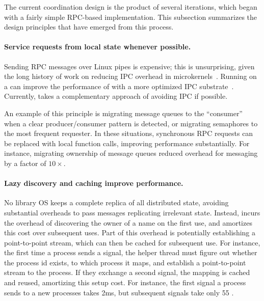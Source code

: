 \label{sec:libos:namespaces:lessons}

The current coordination design is the product of several iterations, which began 
with a fairly simple RPC-based implementation. %
This subsection summarizes the design principles that have emerged from this process.

\paragraph{Service requests from local state whenever possible.}
Sending RPC messages over Linux pipes is expensive;
this is unsurprising, given the long history of 
work on reducing IPC overhead in microkernels~\cite{liedtke93sosp,chen93memory}.  
Running on a \microkernel{} can improve the performance of \graphene{} with
a more optimized IPC substrate~\cite{liedtke95sosp,klein09sel4,elphinstone13microkernels}. Currently, \graphene{} takes a complementary approach of avoiding IPC if possible.

An example of this principle is migrating message queues to the ``consumer'' when a 
clear producer/consumer pattern is detected, or migrating semaphores to the most frequent requester.
In these situations, synchronous RPC requests can be replaced with local function calls, improving
performance substantially.  For instance, migrating ownership of message queues 
reduced overhead for messaging by a factor of $10\times$.

\paragraph{Lazy discovery and caching improve performance.}  
No library OS keeps a complete replica of all distributed state,
avoiding substantial overheads to pass messages replicating irrelevant state.
Instead, \graphene{} incurs the overhead of discovering the owner of a name
on the first use, and amortizes this cost over subsequent uses.
Part of this overhead is potentially establishing a point-to-point stream,
which can then be cached for subsequent use.
For instance, the first time a process sends a signal, the helper thread 
must figure out whether the process id exists, to which process it maps,
and establish a point-to-point stream to the process.
If they exchange a second signal, the mapping is cached and reused, amortizing this 
setup cost.  For instance, the first signal a process sends to a new processes
takes \roughly{}2ms, but subsequent signals take only \roughly{}55 \us{}.

